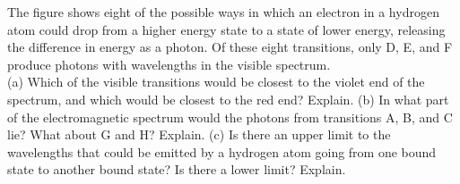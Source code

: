  The figure shows eight of the possible ways in which an
electron in a hydrogen atom could drop from a higher energy
state to a state of lower energy, releasing the difference
in energy as a photon. Of these eight transitions, only D,
E, and F produce photons with wavelengths in the visible
spectrum.\\
 (a) Which of the visible transitions would be
closest to the violet end of the spectrum, and which would
be closest to the red end? Explain.\hwendpart
 (b) In what part of the
electromagnetic spectrum would the photons from transitions
A, B, and C lie? What about G and H? Explain.\hwendpart
 (c) Is
there an upper limit to the wavelengths that could be
emitted by a hydrogen atom going from one bound state to
another bound state? Is there a lower limit? Explain.
